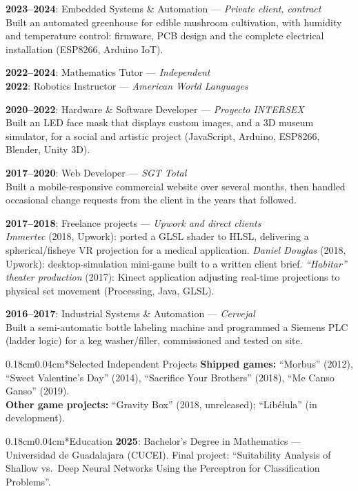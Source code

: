 \documentclass[10.5pt]{article}
\makeatletter
\renewcommand{\section}{\@startsection{section}{1}{0pt}%
  {0.18cm}{0.04cm}{\normalfont\large\bfseries}}
\makeatother
\begin{document}
\textbf{2023--2024}: Embedded Systems \& Automation --- \textit{Private client, contract} \\
Built an automated greenhouse for edible mushroom cultivation, with humidity and temperature control: firmware, PCB design and the complete electrical installation (ESP8266, Arduino IoT).

\textbf{2022--2024}: Mathematics Tutor --- \textit{Independent} \\
\textbf{2022}: Robotics Instructor --- \textit{American World Languages}

\textbf{2020--2022}: Hardware \& Software Developer --- \textit{Proyecto INTERSEX} \\
Built an LED face mask that displays custom images, and a 3D museum simulator, for a social and artistic project (JavaScript, Arduino, ESP8266, Blender, Unity 3D).

\textbf{2017--2020}: Web Developer --- \textit{SGT Total} \\
Built a mobile-responsive commercial website over several months, then handled occasional change requests from the client in the years that followed.

\textbf{2017--2018}: Freelance projects --- \textit{Upwork and direct clients} \\
\textit{Immertec} (2018, Upwork): ported a GLSL shader to HLSL, delivering a spherical/fisheye VR projection for a medical application. \textit{Daniel Douglas} (2018, Upwork): desktop-simulation mini-game built to a written client brief. \textit{``Habitar'' theater production} (2017): Kinect application adjusting real-time projections to physical set movement (Processing, Java, GLSL).

\textbf{2016--2017}: Industrial Systems \& Automation --- \textit{Cervejal} \\
Built a semi-automatic bottle labeling machine and programmed a Siemens PLC (ladder logic) for a keg washer/filler, commissioned and tested on site.

\section*{Selected Independent Projects}
\textbf{Shipped games:} ``Morbus'' (2012), ``Sweet Valentine's Day'' (2014), ``Sacrifice Your Brothers'' (2018), ``Me Canso Ganso'' (2019). \\
\textbf{Other game projects:} ``Gravity Box'' (2018, unreleased); ``Libélula'' (in development).

\section*{Education}
\textbf{2025}: Bachelor's Degree in Mathematics --- Universidad de Guadalajara (CUCEI). Final project: ``Suitability Analysis of Shallow vs.\ Deep Neural Networks Using the Perceptron for Classification Problems''.
\end{document}
